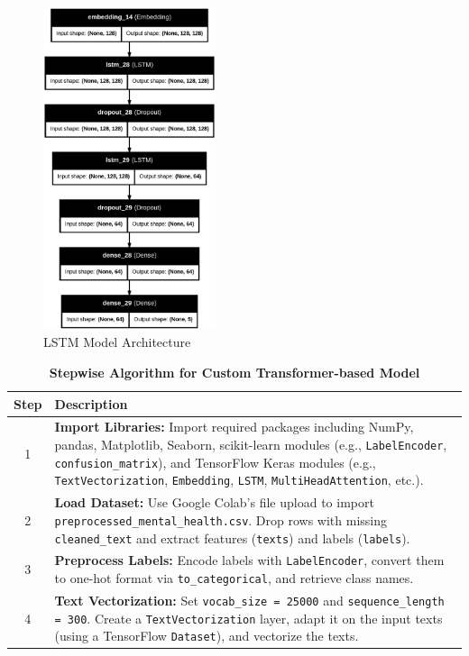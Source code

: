 \pagebreak

\begin{figure}[h!]  
    \centering
    \includegraphics[width=0.45\textwidth]{Images/LSTM MODEL.png}  
    \caption*{LSTM Model Architecture}
    \label{lstm arch}  %
\end{figure}


\begin{table}[H]
    \caption*{\textbf{Stepwise Algorithm for Custom Transformer-based Model}}
    \label{tab:transformer_algorithm}
    \centering
    \renewcommand{\arraystretch}{1.3}
    \small
    \begin{tabularx}{\textwidth}{|c|X|}
        \hline
        \textbf{Step} & \textbf{Description} \\
        \hline
        1 & \textbf{Import Libraries:} Import required packages including NumPy, pandas, Matplotlib, Seaborn, scikit-learn modules (e.g., \texttt{LabelEncoder}, \texttt{confusion\_matrix}), and TensorFlow Keras modules (e.g., \texttt{TextVectorization}, \texttt{Embedding}, \texttt{LSTM}, \texttt{MultiHeadAttention}, etc.). \\
        \hline
        2 & \textbf{Load Dataset:} Use Google Colab's file upload to import \texttt{preprocessed\_mental\_health.csv}. Drop rows with missing \texttt{cleaned\_text} and extract features (\texttt{texts}) and labels (\texttt{labels}). \\
        \hline
        3 & \textbf{Preprocess Labels:} Encode labels with \texttt{LabelEncoder}, convert them to one-hot format via \texttt{to\_categorical}, and retrieve class names. \\
        \hline
        4 & \textbf{Text Vectorization:} Set \texttt{vocab\_size = 25000} and \texttt{sequence\_length = 300}. Create a \texttt{TextVectorization} layer, adapt it on the input texts (using a TensorFlow \texttt{Dataset}), and vectorize the texts. \\
        \hline
    \end{tabularx}
\end{table}

